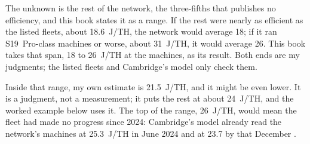 The unknown is the rest of the network, the three-fifths that publishes no efficiency, and this book states it as a range. If the rest were nearly as efficient as the listed fleets, about 18.6~J/TH, the network would average 18; if it ran S19~Pro-class machines or worse, about 31~J/TH, it would average 26. This book takes that span, 18 to 26~J/TH at the machines, as its result. Both ends are my judgments; the listed fleets and Cambridge's model only check them. %

Inside that range, my own estimate is 21.5~J/TH, and it might be even lower. It is a judgment, not a measurement; it puts the rest at about 24~J/TH, and the worked example below uses it. The top of the range, 26~J/TH, would mean the fleet had made no progress since 2024: Cambridge's model already read the network's machines at 25.3~J/TH in June 2024 and at 23.7 by that December \autocite{CCAF2025}. %

